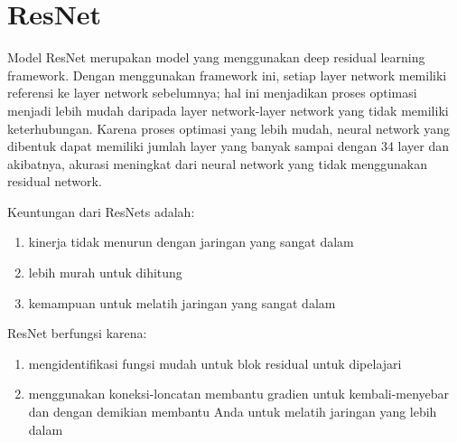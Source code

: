 \section{ResNet}
Model ResNet merupakan model yang menggunakan deep residual learning framework. Dengan menggunakan framework ini, setiap layer network memiliki referensi ke layer network sebelumnya; hal ini menjadikan proses optimasi menjadi lebih mudah daripada layer network-layer network yang tidak memiliki keterhubungan. Karena proses optimasi yang lebih mudah, neural network yang dibentuk
dapat memiliki jumlah layer yang banyak sampai dengan 34 layer dan akibatnya, akurasi meningkat dari neural network yang tidak menggunakan residual network.

Keuntungan dari ResNets adalah:

\begin{enumerate}
\item kinerja tidak menurun dengan jaringan yang sangat dalam
\item lebih murah untuk dihitung
\item kemampuan untuk melatih jaringan yang sangat dalam
\end{enumerate}

ResNet berfungsi karena:

\begin{enumerate}
\item mengidentifikasi fungsi mudah untuk blok residual untuk dipelajari
\item menggunakan koneksi-loncatan membantu gradien untuk kembali-menyebar dan dengan demikian membantu Anda untuk melatih jaringan yang lebih dalam
\end{enumerate}